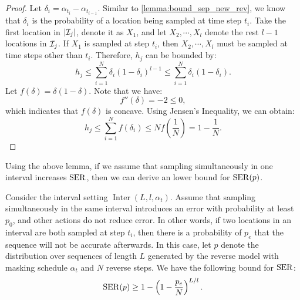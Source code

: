 \begin{proof}
    Let $\delta_i=\alpha_{t_i}-\alpha_{t_{i-1}}$. Similar to \cref{lemma:bound_sep_new_rev}, we know that $\delta_i$ is the probability of a location being sampled at time step $t_i$. Take the first location in $|{\mathcal{I}}_j|$, denote it as $X_1$, and let $X_2,\cdots,X_l$ denote the rest $l-1$ locations in ${\mathcal{I}}_j$. If $X_1$ is sampled at step $t_i$, then $X_2,\cdots,X_l$ must be sampled at time steps other than $t_i$. Therefore, $h_j$ can be bounded by:
    $$h_j\leq \sum_{i=1}^{N}\delta_i(1-\delta_i)^{l-1}\leq\sum_{i=1}^{N}\delta_i(1-\delta_i).$$
    Let $f(\delta)=\delta(1-\delta)$. Note that we have:
    $$f''(\delta)=-2\leq 0,$$
    which indicates that $f(\delta)$ is concave. Using Jensen's Inequality, we can obtain:
    $$h_j\leq \sum_{i=1}^{N}f(\delta_i)\leq Nf\left(\frac{1}{N}\right)=1-\frac{1}{N}.$$
    
    

\end{proof}

Using the above lemma, if we assume that sampling simultaneously in one interval increases $\operatorname{SER}$, then we can derive an lower bound for $\operatorname{SER}(p)$.

\begin{lemma}
\label{lemma:acc_inter}
    Consider the interval setting $\operatorname{Inter}(L,l,\alpha_t)$. Assume that sampling simultaneously in the same interval introduces an error with probability at least $p_0$, and other actions do not reduce error. In other words, if two locations in an interval are both sampled at step $t_i$, then there is a probability of $p_e$ that the sequence will not be accurate afterwards. In this case, let $p$ denote the distribution over sequences of length $L$ generated by the reverse model with masking schedule $\alpha_t$ and $N$ reverse steps. We have the following bound for $\operatorname{SER}$: 
    $$\operatorname{SER}(p)\geq 1-\left(1-\frac{p_e}{N}\right)^{L/l}.$$
\end{lemma}

